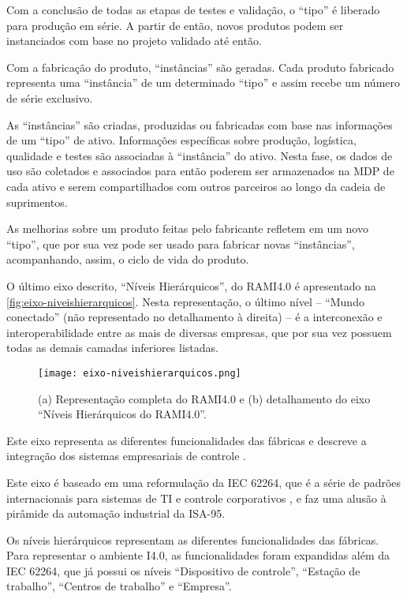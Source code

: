 Com a conclusão de todas as etapas de testes e validação, o ``tipo'' é liberado para produção em série. A partir de então, novos produtos podem ser instanciados com base no projeto validado até então.

Com a fabricação do produto, ``instâncias'' são geradas. Cada produto fabricado representa uma ``instância'' de um determinado ``tipo'' e assim recebe um número de série exclusivo.

As ``instâncias'' são criadas, produzidas ou fabricadas com base nas informações de um ``tipo'' de ativo. Informações específicas sobre produção, logística, qualidade e testes são associadas à ``instância'' do ativo. Nesta fase, os dados de uso são coletados e associados para então poderem ser armazenados na MDP de cada ativo e serem compartilhados com outros parceiros ao longo da cadeia de suprimentos.

As melhorias sobre um produto feitas pelo fabricante refletem em um novo ``tipo'', que por sua vez pode ser usado para fabricar novas ``instâncias'', acompanhando, assim, o ciclo de vida do produto.

O último eixo descrito, ``Níveis Hierárquicos'', do RAMI4.0 é apresentado na \autoref{fig:eixo-niveishierarquicos}. Nesta representação, o último nível -- ``Mundo conectado'' (não representado no detalhamento à direita) -- é a interconexão e interoperabilidade entre as mais de diversas empresas, que por sua vez possuem todas as demais camadas inferiores listadas.

\begin{figure}[htb]
	\centering
	\texttt{[image: eixo-niveishierarquicos.png]}
	\caption{(a) Representação completa do RAMI4.0 e (b) detalhamento do eixo ``Níveis Hierárquicos do RAMI4.0''.}
	\label{fig:eixo-niveishierarquicos}
\end{figure}

Este eixo representa as diferentes funcionalidades das fábricas e descreve a integração dos sistemas empresariais de controle \cite{pisching2018arquitetura}.

Este eixo é baseado em uma reformulação da IEC 62264, que é a série de padrões internacionais para sistemas de TI e controle corporativos \cite{hankel2015rami}, e faz uma alusão à pirâmide da automação industrial da ISA-95.

Os níveis hierárquicos representam as diferentes funcionalidades das fábricas. Para representar o ambiente I4.0, as funcionalidades foram expandidas além da IEC 62264, que já possui os níveis ``Dispositivo de controle'', ``Estação de trabalho'', ``Centros de trabalho'' e ``Empresa''.


